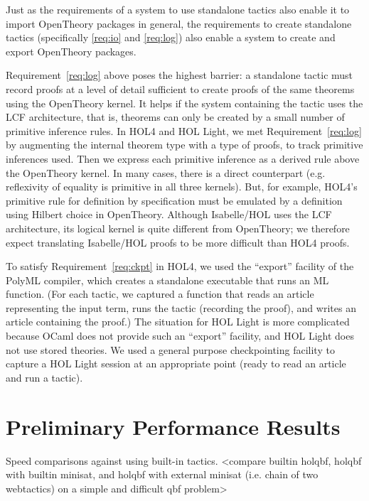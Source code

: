 \documentclass{llncs}
\newcommand{\OpenTheory}{OpenTheory\xspace}
\newcommand{\eg}{e.g.\xspace}
\begin{document}
Just as the requirements of a system to use standalone tactics also enable it to import \OpenTheory packages in general, the requirements to create standalone tactics (specifically \ref{req:io} and \ref{req:log}) also enable a system to create and export \OpenTheory packages.

Requirement~\ref{req:log} above poses the highest barrier: a standalone tactic must record proofs at a level of detail sufficient to create proofs of the same theorems using the \OpenTheory kernel.
It helps if the system containing the tactic uses the LCF architecture, that is, theorems can only be created by a small number of primitive inference rules.
In HOL4 and HOL Light, we met Requirement~\ref{req:log} by augmenting the internal theorem type with a type of proofs, to track primitive inferences used.
Then we express each primitive inference as a derived rule above the \OpenTheory kernel.
In many cases, there is a direct counterpart (\eg reflexivity of equality is primitive in all three kernels).
But, for example, HOL4's primitive rule for definition by specification must be emulated by a definition using Hilbert choice in \OpenTheory.
Although Isabelle/HOL uses the LCF architecture, its logical kernel is quite different from \OpenTheory; we therefore expect translating Isabelle/HOL proofs to be more difficult than HOL4 proofs.

To satisfy Requirement~\ref{req:ckpt} in HOL4, we used the ``export'' facility of the PolyML compiler, which creates a standalone executable that runs an ML function.
(For each tactic, we captured a function that reads an article representing the input term, runs the tactic (recording the proof), and writes an article containing the proof.)
The situation for HOL Light is more complicated because OCaml does not provide such an ``export'' facility, and HOL Light does not use stored theories.
We used a general purpose checkpointing facility to capture a HOL Light session at an appropriate point (ready to read an article and run a tactic).

\section{Preliminary Performance Results}
\label{sec:performance}

Speed comparisons against using built-in tactics.
<compare builtin holqbf, holqbf with builtin minisat, and holqbf with external minisat (i.e. chain of two webtactics) on a simple and difficult qbf problem>
\end{document}
